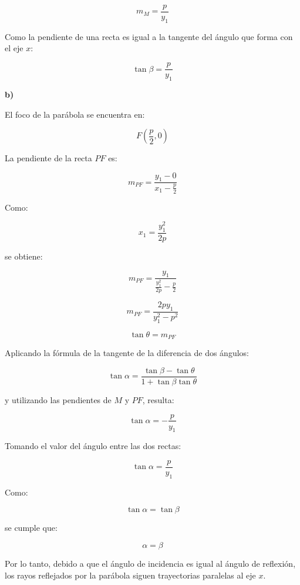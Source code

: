 \documentclass[11pt,a4paper]{article}
\begin{document}
\begin{enumerate}[label=4.\arabic*), itemsep=0.3cm]
        \[
          m_M=\frac{p}{y_1}
        \]

        Como la pendiente de una recta es igual a la tangente del ángulo
        que forma con el eje \(x\):

        \[
          \boxed{\tan\beta=\frac{p}{y_1}}
        \]

        \textbf{b)}

        El foco de la parábola se encuentra en:

        \[
          F\left(\frac{p}{2},0\right)
        \]

        La pendiente de la recta \(PF\) es:

        \[
          m_{PF}
          =
          \frac{y_1-0}{x_1-\frac{p}{2}}
        \]

        Como:

        \[
          x_1=\frac{y_1^2}{2p}
        \]

        se obtiene:

        \[
          m_{PF}
          =
          \frac{y_1}
          {\frac{y_1^2}{2p}-\frac{p}{2}}
        \]

        \[
          m_{PF}
          =
          \frac{2py_1}{y_1^2-p^2}
        \]

        \[
          \tan\theta = m_{PF}
        \]

        Aplicando la fórmula de la tangente de la diferencia de dos ángulos:

        \[
          \tan\alpha=
          \frac{\tan\beta-\tan\theta}
          {1+\tan\beta\tan\theta}
        \]

        y utilizando las pendientes de \(M\) y \(PF\), resulta:

        \[
          \tan\alpha=-\frac{p}{y_1}
        \]

        Tomando el valor del ángulo entre las dos rectas:

        \[
          \boxed{\tan\alpha=\frac{p}{y_1}}
        \]

        Como:

        \[
          \tan\alpha=\tan\beta
        \]

        se cumple que:

        \[
          \boxed{\alpha=\beta}
        \]

        Por lo tanto, debido a que el ángulo de incidencia es igual al
        ángulo de reflexión, los rayos reflejados por la parábola siguen
        trayectorias paralelas al eje \(x\).


\end{enumerate}
\end{document}
